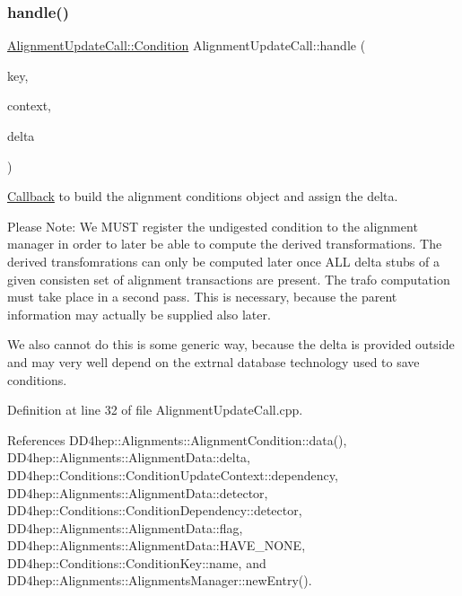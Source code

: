 \subsubsection{\texorpdfstring{handle()}{handle()}}
{\footnotesize\ttfamily \hyperlink{class_d_d4hep_1_1_alignments_1_1_alignment_update_call_ac41c367dd7b7027a76d7b691223927fd}{Alignment\+Update\+Call\+::\+Condition} Alignment\+Update\+Call\+::handle (\begin{DoxyParamCaption}\item[{const \hyperlink{class_d_d4hep_1_1_alignments_1_1_alignment_update_call_a3c759edb169218bd8bc3b1c15d8af2e0}{Condition\+Key} \&}]{key,  }\item[{const \hyperlink{class_d_d4hep_1_1_alignments_1_1_alignment_update_call_a648c995a6ab187911c79a687c8df0fa9}{Update\+Context} \&}]{context,  }\item[{const \hyperlink{class_d_d4hep_1_1_alignments_1_1_alignment_update_call_a06a6522dece2daba45cdc69c079e144c}{Delta} \&}]{delta }\end{DoxyParamCaption})\hspace{0.3cm}{\ttfamily [virtual]}}



\hyperlink{class_d_d4hep_1_1_callback}{Callback} to build the alignment conditions object and assign the delta. 

Please Note\+: We M\+U\+ST register the undigested condition to the alignment manager in order to later be able to compute the derived transformations. The derived transfomrations can only be computed \textquotesingle{}later\textquotesingle{} once A\+LL delta stubs of a given consisten set of alignment transactions are present. The trafo computation must take place in a second pass. This is necessary, because the parent information may actually be supplied also \textquotesingle{}later\textquotesingle{}.

We also cannot do this is some \textquotesingle{}generic\textquotesingle{} way, because the delta is provided outside and may very well depend on the extrnal database technology used to save conditions. 

Definition at line 32 of file Alignment\+Update\+Call.\+cpp.



References D\+D4hep\+::\+Alignments\+::\+Alignment\+Condition\+::data(), D\+D4hep\+::\+Alignments\+::\+Alignment\+Data\+::delta, D\+D4hep\+::\+Conditions\+::\+Condition\+Update\+Context\+::dependency, D\+D4hep\+::\+Alignments\+::\+Alignment\+Data\+::detector, D\+D4hep\+::\+Conditions\+::\+Condition\+Dependency\+::detector, D\+D4hep\+::\+Alignments\+::\+Alignment\+Data\+::flag, D\+D4hep\+::\+Alignments\+::\+Alignment\+Data\+::\+H\+A\+V\+E\+\_\+\+N\+O\+NE, D\+D4hep\+::\+Conditions\+::\+Condition\+Key\+::name, and D\+D4hep\+::\+Alignments\+::\+Alignments\+Manager\+::new\+Entry().

